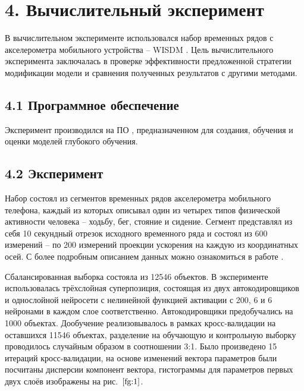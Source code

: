 \documentclass[12pt]{article}
\begin{document}
\section{4. Вычислительный эксперимент}
В вычислительном эксперименте использовался набор временных рядов с акселерометра мобильного устройства -- WISDM \cite{Kwapisz2010Activity}. Цель вычислительного эксперимента заключалась в проверке эффективности предложенной стратегии модификации модели и сравнения полученных результатов с другими методами.
\subsection{4.1 Программное обеспечение}
Эксперимент производился на ПО \cite{bah-code}, предназначенном для создания, обучения и оценки моделей глубокого обучения.
\subsection{4.2 Эксперимент}
Набор состоял из сегментов временных рядов акселерометра мобильного телефона, каждый из которых описывал один из четырех типов физической активности человека -- ходьбу, бег, стояние и сидение. Сегмент представлял из себя 10 секундный отрезок исходного временного ряда и состоял из 600 измерений -- по 200 измерений проекции ускорения на каждую из координатных осей. С более подробным описанием данных можно ознакомиться в работе \cite{Kwapisz2010Activity}.

Сбалансированная выборка состояла из 12546 объектов. В эксперименте использовалась трёхслойная суперпозиция, состоящая из двух автокодировщиков и однослойной нейросети с нелинейной функцией активации с 200, 6 и 6 нейронами в каждом слое соответственно. Автокодировщики предобучались на 1000 объектах. Дообучение реализовывалось в рамках кросс-валидации на оставшихся 11546 объектах, разделение на обучающую и контрольную выборку проводилось случайным образом в соотношении 3:1. Было произведено 15 итераций кросс-валидации, на основе изменений вектора параметров были посчитаны дисперсии компонент вектора, гистограммы для параметров первых двух слоёв изображены на рис.~$\ref{fg:1}$.
\end{document}
